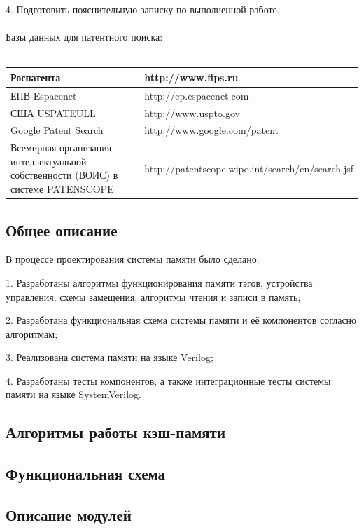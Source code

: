 \documentclass[13pt]{article}
\begin{document}
    4. Подготовить пояснительную записку по выполненной работе.\\\\
    Базы данных для патентного поиска:\\\\
    \begin{tabular}{ | p{200pt} | p{220pt} |}
	\hline
	Роспатента & http://www.fips.ru \\ \hline
	ЕПВ Espacenet & http://ep.espacenet.com \\ \hline
    США USPATEULL & http://www.uspto.gov \\ \hline
	Google Patent Search & http://www.google.com/patent \\ \hline
	Всемирная организация интеллектуальной собственности (ВОИС) в системе PATENSCOPE & http://patentscope.wipo.int/search/en/search.jsf \\ \hline
    \end{tabular} 
    \newpage
	\subsection{Общее описание}
	
	В процессе проектирования системы памяти было сделано:
	
	1. Разработаны алгоритмы функционирования памяти тэгов, устройства управления, схемы замещения, алгоритмы чтения и записи в память;
	
	2. Разработана функциональная схема системы памяти и её компонентов согласно алгоритмам;
	
	3. Реализована система памяти на языке Verilog;
	
	4. Разработаны тесты компонентов, а также интеграционные тесты системы памяти на языке SystemVerilog.
	\subsection{Алгоритмы работы кэш-памяти}
	
	\subsection{Функциональная схема}
	\newpage
	\subsection{Описание модулей}
\end{document}
